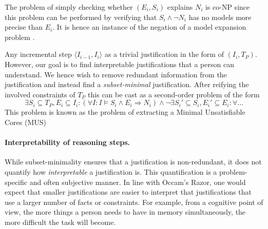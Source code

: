 The problem of simply checking whether $(E_i,S_i)$ explains $N_i$ is co-NP since this problem can be performed by verifying that $S_i \land \lnot N_i$ has no models more precise than $E_i$. It is hence an instance of the negation of a model expansion problem \cite{ternovskaMXcomplexity}.

Any incremental step $\langle I_{i-1}, I_i \rangle$ as a trivial justification in the form of $(I_i, T_P)$. However, our goal is to find interpretable justifications that a person can understand. We hence wish to remove redundant information from the justification and instead find a \emph{subset-minimal} justification. After reifying the involved constraints of $T_P$ this can be cast as a second-order problem of the form
\[\exists S_i\subseteq T_P, E_i\subseteq I_i: (\forall I: I\models S_i\land E_i \Rightarrow N_i) \land \lnot \exists S_i'\subseteq S_i, E_i'\subseteq E_i: \forall ... \]
This problem is known as the problem of extracting a Minimal Unsatisfiable Cores (MUS) 


\paragraph{Interpretability of reasoning steps.}
While subset-minimality ensures that a justification is non-redundant, it does not quantify how \textit{interpretable} a justification is. 
This quantification is a problem-specific and often subjective manner. In line with Occam's Razor, one would expect that smaller justifications are easier to interpret that justifications that use a larger number of facts or constraints. For example, from a cognitive point of view, the more things a person needs to have in memory simultaneously, the more difficult the task will become. 

